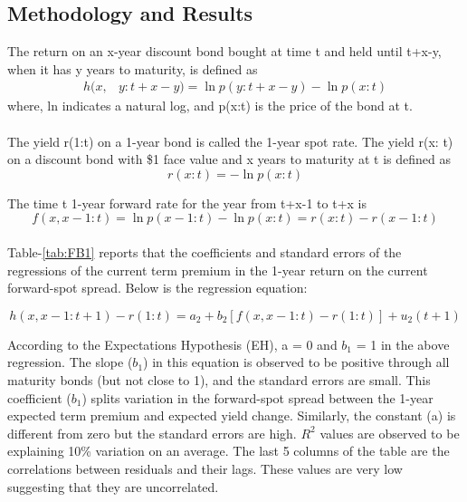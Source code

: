 \documentclass[11pt]{article}
\begin{document}
\subsection{Methodology and Results}
The return on an x-year discount bond bought at time t and held until t+x-y, when
it has y years to maturity, is defined as
\begin{equation} \label{eq:FB1}
\begin{aligned}
h(x,&y:t+x-y)=\ln p(y:t+x-y)-\ln p(x:t)
\end{aligned}
\end{equation}
where, ln indicates a natural log, and p(x:t) is the price of the bond at t.

\paragraph{} The yield r(1:t) on a 1-year bond is called
the 1-year spot rate. The yield r(x: t) on a discount bond with
\$1 face value and x years to maturity at t is
defined as
\begin{equation} \label{eq:FB2}
r(x:t)=-\ln p(x:t)
\end{equation}

The time t 1-year forward rate for the year
from t+x-1 to t+x is
\begin{equation} \label{eq:FB3}
f(x,x-1:t)=\ln p(x-1:t)-\ln p(x:t)=r(x:t)-r(x-1:t)
\end{equation}

\paragraph{} Table-\ref{tab:FB1} reports that the coefficients and standard errors of the regressions of the current term premium in the 1-year return on the current forward-spot spread. Below is the regression equation:

\begin{equation} \label{eq7}
h(x,x-1:t+1)-r(1:t)=a_{2}+b_{2}[f(x,x-1:t)-r(1:t)]+u_{2}(t+1)
\end{equation}

According to the Expectations Hypothesis (EH), a = 0 and $b_{1}$ = 1 in the above regression. The slope ($b_{1}$) in this equation is observed to be positive through all maturity bonds (but not close to 1), and the standard errors are small. This coefficient ($b_{1}$) splits variation in the forward-spot spread between the 1-year expected term premium and expected yield change. Similarly, the constant (a) is different from zero but the standard errors are high. $R^{2}$ values are observed to be explaining 10\% variation on an average. The last 5 columns of the table are the correlations between residuals and their lags. These values are very low suggesting that they are uncorrelated.
\end{document}
